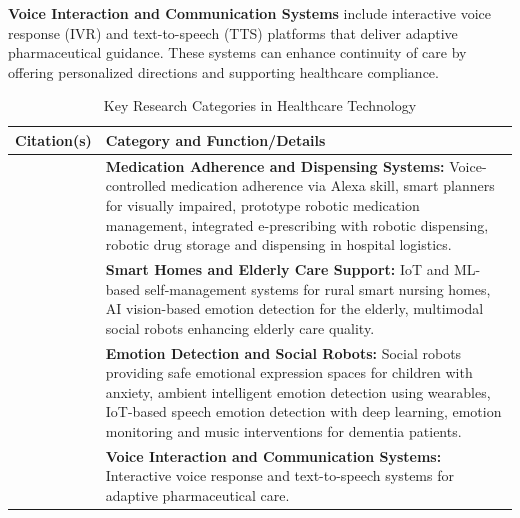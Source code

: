 \textbf{Voice Interaction and Communication Systems} include interactive voice response (IVR) and text-to-speech (TTS) platforms that deliver adaptive pharmaceutical guidance. These systems can enhance continuity of care by offering personalized directions and supporting healthcare compliance.

\begin{table}[h!]
\centering
\begin{tabular}{|p{4cm}|p{10.5cm}|}
\hline
\textbf{Citation(s)} & \textbf{Category and Function/Details} \\
\hline
\cite{58,59,60,61,62} & 
\textbf{Medication Adherence and Dispensing Systems:} Voice-controlled medication adherence via Alexa skill, smart planners for visually impaired, prototype robotic medication management, integrated e-prescribing with robotic dispensing, robotic drug storage and dispensing in hospital logistics. \\
\hline
\cite{63,64,65,66} & 
\textbf{Smart Homes and Elderly Care Support:} IoT and ML-based self-management systems for rural smart nursing homes, AI vision-based emotion detection for the elderly, multimodal social robots enhancing elderly care quality. \\
\hline
\cite{67,68,69} & 
\textbf{Emotion Detection and Social Robots:} Social robots providing safe emotional expression spaces for children with anxiety, ambient intelligent emotion detection using wearables, IoT-based speech emotion detection with deep learning, emotion monitoring and music interventions for dementia patients. \\
\hline
\cite{70} & 
\textbf{Voice Interaction and Communication Systems:} Interactive voice response and text-to-speech systems for adaptive pharmaceutical care. \\
\hline
\end{tabular}
\caption{Key Research Categories in Healthcare Technology}
\label{tab:key_areas}
\end{table}
